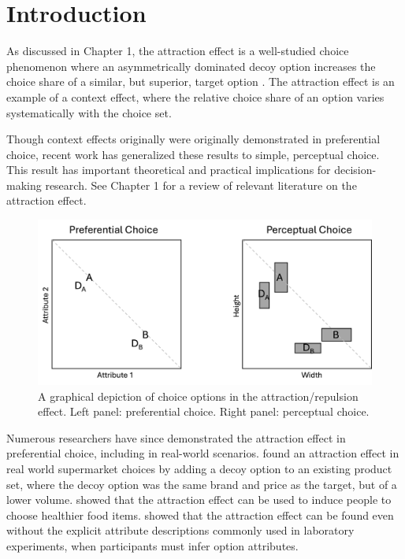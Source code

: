 \section{Introduction}
As discussed in Chapter 1, the attraction effect is a well-studied choice phenomenon where an asymmetrically dominated decoy option increases the choice share of a similar, but superior, target option \parencite{huberAddingAsymmetricallyDominated1982d}. The attraction effect is an example of a context effect, where the relative choice share of an option varies systematically with the choice set.

Though context effects originally were originally demonstrated in preferential choice, recent work has generalized these results to simple, perceptual choice. This result has important theoretical and practical implications for decision-making research. See Chapter 1 for a review of relevant literature on the attraction effect.


\begin{figure}
   \includegraphics[width=\linewidth]{figures/pref_v_percep.jpg}
   \caption{A graphical depiction of choice options in the attraction/repulsion effect. Left panel: preferential choice. Right panel: perceptual choice.}
   \label{fig:fig_opts}
\end{figure}

Numerous researchers have since demonstrated the attraction effect in preferential choice, including in real-world scenarios. \textcite{doyleRobustnessAsymmetricallyDominated1999} found an attraction effect in real world supermarket choices by adding a decoy option to an existing product set, where the decoy option was the same brand and price as the target, but of a lower volume. \textcite{van2021attract} showed that the attraction effect can be used to induce people to choose healthier food items. \textcite{slaughterDecoyEffectsAttributelevel1999b} showed that the attraction effect can be found even without the explicit attribute descriptions commonly used in laboratory experiments, when participants must infer option attributes. 


